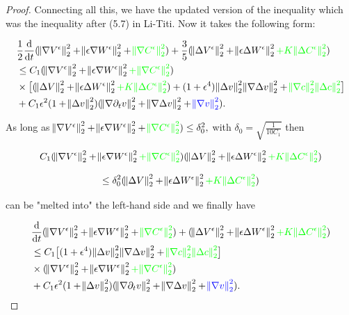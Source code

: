 \documentclass[11pt]{article}
\newcommand*\diff{\mathop{}\!\mathrm{d}}
\begin{document}
\begin{proof}
Connecting all this, we have the updated version of the inequality which was the inequality after (5.7) in Li-Titi. Now it takes the following form:

\begin{equation}
  \begin{split}
    & \frac{1}{2} \frac{\diff}{\diff t} (\norm{\nabla V^\epsilon}^2_2 + \norm{\epsilon \nabla W^\epsilon}^2_2 + \textcolor{green}{\norm{\nabla C^\epsilon}^2_2}) + \frac{3}{5} (\norm{\Delta V^\epsilon}^2_2 + \norm{\epsilon \Delta W^\epsilon}^2_2 \textcolor{green}{+ K \norm{\Delta C^\epsilon}_2^2}) \\
    & \leq C_1 (\norm{\nabla V^\epsilon}^2_2 + \norm{\epsilon \nabla W^\epsilon}^2_2 \textcolor{green}{+ \norm{\nabla C^\epsilon}^2_2}) \\
    & \times \big [ (\norm{\Delta V}^2_2 + \norm{\epsilon \Delta W^\epsilon}^2_2 \textcolor{green}{+ K \norm{\Delta C^\epsilon}_2^2}) + (1+ \epsilon^4) \norm{\Delta v}^2_2 \norm{\nabla \Delta v}^2_2 + \textcolor{green}{\norm{\nabla c}^2_2 \norm{\Delta c}^2_2} \big ] \\
    & + C_1 \epsilon^2 (1 + \norm{\Delta v}^2_2) (\norm{\nabla \partial_t v}^2_2 + \norm{\nabla \Delta v}^2_2 + \textcolor{blue}{\norm{\nabla v}_2^2}).
  \end{split}
\end{equation}

As long as $\norm{\nabla V^\epsilon}^2_2 + \norm{\epsilon \nabla W^\epsilon}^2_2 + \textcolor{green}{\norm{\nabla C^\epsilon}^2_2}) \leq \delta_0^2,$ with $\delta_0 = \sqrt{\frac{1}{10 C_1}}$ then 

$$ C_1 (\norm{\nabla V^\epsilon}^2_2 + \norm{\epsilon \nabla W^\epsilon}^2_2 \textcolor{green}{+ \norm{\nabla C^\epsilon}^2_2})(\norm{\Delta V}^2_2 + \norm{\epsilon \Delta W^\epsilon}^2_2 \textcolor{green}{+ K \norm{\Delta C^\epsilon}_2^2}) $$

$$ \leq \delta_0^2 (\norm{\Delta V}^2_2 + \norm{\epsilon \Delta W^\epsilon}^2_2 \textcolor{green}{+ K \norm{\Delta C^\epsilon}_2^2}) $$

can be "melted into" the left-hand side and we finally have

\begin{equation}
  \begin{split}
    & \frac{\diff}{\diff t} (\norm{\nabla V^\epsilon}^2_2 + \norm{\epsilon \nabla W^\epsilon}^2_2 + \textcolor{green}{\norm{\nabla C^\epsilon}^2_2}) + (\norm{\Delta V^\epsilon}^2_2 + \norm{\epsilon \Delta W^\epsilon}^2_2 \textcolor{green}{+ K \norm{\Delta C^\epsilon}_2^2}) \\
    & \leq C_1 \big [ (1+ \epsilon^4) \norm{\Delta v}^2_2 \norm{\nabla \Delta v}^2_2 + \textcolor{green}{\norm{\nabla c}^2_2 \norm{\Delta c}^2_2} \big ] \\
    & \times (\norm{\nabla V^\epsilon}^2_2 + \norm{\epsilon \nabla W^\epsilon}^2_2 \textcolor{green}{+ \norm{\nabla C^\epsilon}^2_2}) \\
    & + C_1 \epsilon^2 (1 + \norm{\Delta v}^2_2) (\norm{\nabla \partial_t v}^2_2 + \norm{\nabla \Delta v}^2_2 + \textcolor{blue}{\norm{\nabla v}_2^2}).
  \end{split}
\end{equation}


\end{proof}
\end{document}
